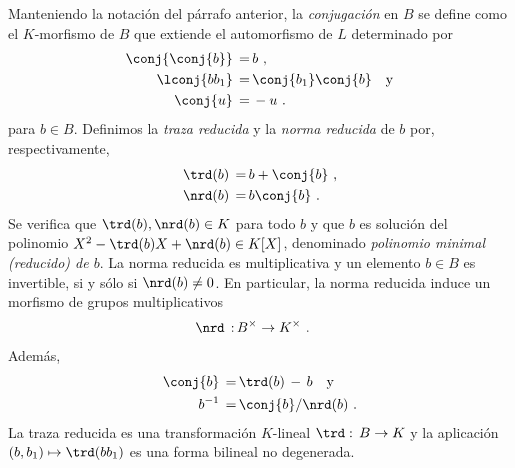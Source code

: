 Manteniendo la notaci\'{o}n del p\'{a}rrafo anterior, la
\emph{conjugaci\'{o}n}
en $B$ se define como el $K$-morfismo de $B$ que
extiende el automorfismo de $L$ determinado por
\begin{align*}
 \conj{\conj{b}} \,=\, & b\text{ ,} \\
 \lconj{bb_{1}} \,=\, & \conj{b_{1}}\conj{b}\quad\text{y} \\
 \conj{u} \,=\, & -u\text{ .}
\end{align*}
%
para $b\in B$. Definimos la \emph{traza reducida}
y la \emph{norma reducida}
de $b$ por, respectivamente,
\begin{align*}
 \trd(b)\,=\, & b+\conj{b}\text{ ,}\\
 \nrd(b)\,=\, & b\conj{b}\text{ .}
\end{align*}
%
Se verifica que $\trd(b),\nrd(b)\in K$ para todo $b$ y que $b$ es
soluci\'{o}n del polinomio $X^{2}-\trd(b)X+\nrd(b)\in K[X]$, denominado
\emph{polinomio minimal (reducido) de $b$}.
La norma reducida es
multiplicativa y un elemento $b\in B$ es invertible, si y s\'{o}lo si
$\nrd(b)\not =0$. En particular, la norma reducida induce un morfismo de
grupos multiplicativos
\begin{align*}
 \nrd\,:\, & B^{\times}\rightarrow K^{\times}
 \text{ .}
\end{align*}
%
Adem\'{a}s,
\begin{align*}
 \conj{b} \,=\, & \trd(b)\,-\,b\quad\text{y}\\
 b^{-1} \,=\, & \conj{b}/\nrd(b)\text{ .}
\end{align*}
%
La traza reducida es una transformaci\'{o}n $K$-lineal
${\trd}:\,B\rightarrow K$ y la aplicaci\'{o}n $(b,b_{1})\mapsto \trd(bb_{1})$
es una forma bilineal no degenerada.

